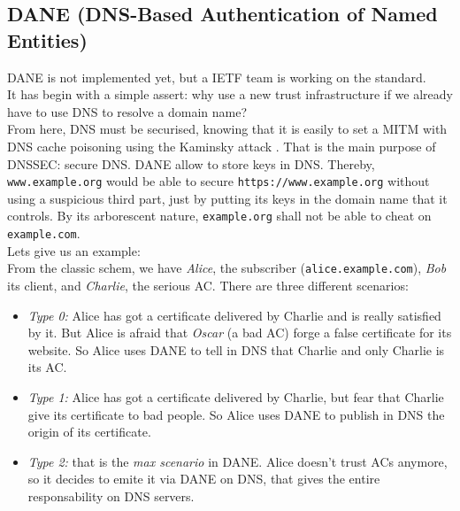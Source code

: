 \documentclass[journal, a4paper]{IEEEtran}
\begin{document}
\subsection{DANE (DNS-Based Authentication of Named Entities)}
\label{dane}

DANE is not implemented yet, but a IETF team is working on the standard.\\
It has begin with a simple assert: why use a new trust infrastructure if we already have to use DNS to resolve a domain name?\\
From here, DNS must be securised, knowing that it is easily to set a MITM with DNS cache poisoning \cite{aa04} using the Kaminsky attack \cite{bor08}. That is the main purpose of DNSSEC: secure DNS. DANE allow to store keys in DNS. Thereby, \verb$www.example.org$ would be able to secure \verb$https://www.example.org$ without using a suspicious third part, just by putting its keys in the domain name that it controls. By its arborescent nature, \verb$example.org$ shall not be able to cheat on \verb$example.com$.\\

Lets give us an example:\\
From the classic schem, we have \textit{Alice}, the subscriber (\verb$alice.example.com$), \textit{Bob} its client, and \textit{Charlie}, the serious AC. There are three different scenarios:
\begin{itemize}
	\item \textit{Type 0:} Alice has got a certificate delivered by Charlie and is really satisfied by it. But Alice is afraid that \textit{Oscar} (a bad AC) forge a false certificate for its website. So Alice uses DANE to tell in DNS that Charlie and only Charlie is its AC.
	\item \textit{Type 1:} Alice has got a certificate delivered by Charlie, but fear that Charlie give its certificate to bad people. So Alice uses DANE to publish in DNS the origin of its certificate.
	\item \textit{Type 2:} that is the \textit{max scenario} in DANE. Alice doesn't trust ACs anymore, so it decides to emite it via DANE on DNS, that gives the entire responsability on DNS servers. 
\end{itemize}
\end{document}
